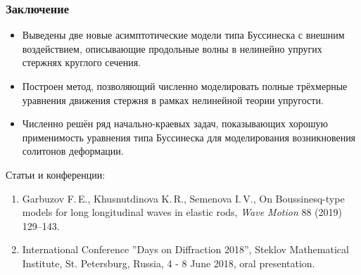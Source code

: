 \documentclass{beamer}
\begin{document}
\begin{frame} \frametitle{Заключение}
\begin{itemize}
	\item Выведены две новые асимптотические модели типа Буссинеска с внешним воздействием, описывающие продольные волны в нелинейно упругих стержнях круглого сечения.
	\item Построен метод, позволяющий численно моделировать полные трёхмерные уравнения движения стержня в рамках нелинейной теории упругости.
	\item Численно решён ряд начально-краевых задач, показывающих хорошую применимость уравнения типа Буссинеска для моделирования возникновения солитонов деформации.
\end{itemize}


Статьи и конференции:
\footnotesize
\begin{enumerate}
	\item Garbuzov F.\,E., Khusnutdinova K.\,R., Semenova I.\,V., On Boussinesq-type models for long longitudinal waves in elastic rods, \textit{Wave Motion} 88 (2019) 129--143.
	\item International Conference ''Days on Diffraction 2018'', Steklov Mathematical Institute, St.  Petersburg, Russia, 4 - 8 June 2018, oral presentation.
\end{enumerate}

\end{frame}
\end{document}
